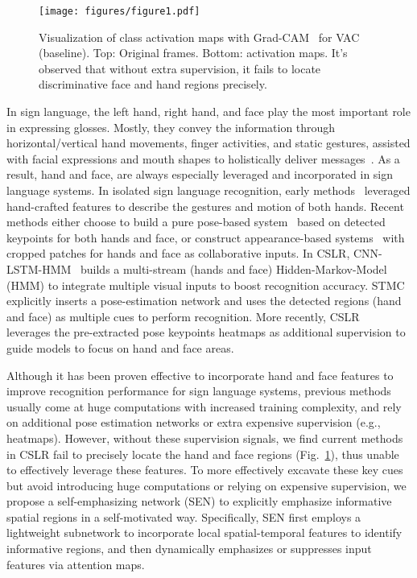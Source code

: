 \documentclass[letterpaper]{article} \usepackage{aaai23}  \usepackage{times}  \usepackage{helvet}  \usepackage{courier}  \usepackage[hyphens]{url}  \usepackage{graphicx} \urlstyle{rm} \def\UrlFont{\rm}  \usepackage{natbib}  \usepackage{caption} \frenchspacing  \setlength{\pdfpagewidth}{8.5in} \setlength{\pdfpageheight}{11in} \usepackage{algorithm}
\begin{document}
\begin{figure}[t]
    \centering
    \texttt{[image: figures/figure1.pdf]}
    \caption{Visualization of class activation maps with Grad-CAM~\cite{selvaraju2017grad} for VAC~\cite{Min_2021_ICCV} (baseline). Top: Original frames. Bottom: activation maps. It's observed that without extra supervision, it fails to locate discriminative face and hand regions precisely. }
    \label{fig1}
  \end{figure}

In sign language, the left hand, right hand, and face play the most important role in expressing glosses. Mostly, they convey the information through horizontal/vertical hand movements, finger activities, and static gestures, assisted with facial expressions and mouth shapes to holistically deliver messages~\cite{dreuw2007speech,ong2005automatic}. As a result, hand and face, are always especially leveraged and incorporated in sign language systems. In isolated sign language recognition, early methods~\cite{freeman1995orientation,sun2013discriminative} leveraged hand-crafted features to describe the gestures and motion of both hands. Recent methods either choose to build a pure pose-based system~\cite{tunga2021pose,hu2021signbert} based on detected keypoints for both hands and face, or construct appearance-based systems~\cite{hu2021hand,boukhayma20193d} with cropped patches for hands and face as collaborative inputs. In CSLR, CNN-LSTM-HMM~\cite{koller2019weakly} builds a multi-stream (hands and face) Hidden-Markov-Model (HMM) to integrate multiple visual inputs to boost recognition accuracy. STMC~\cite{zhou2020spatial} explicitly inserts a pose-estimation network and uses the detected regions (hand and face) as multiple cues to perform recognition. More recently, CSLR~\cite{zuo2022c2slr} leverages the pre-extracted pose keypoints heatmaps as additional supervision to guide models to focus on hand and face areas. 

Although it has been proven effective to incorporate hand and face features to improve recognition performance for sign language systems, previous methods usually come at huge computations with increased training complexity, and rely on additional pose estimation networks or extra expensive supervision (e.g., heatmaps). However, without these supervision signals, we find current methods~\cite{Min_2021_ICCV,hao2021self,cheng2020fully} in CSLR fail to precisely locate the hand and face regions (Fig.~\ref{fig1}), thus unable to effectively leverage these features. To more effectively excavate these key cues but avoid introducing huge computations or relying on expensive supervision, we propose a self-emphasizing network (SEN) to explicitly emphasize informative spatial regions in a self-motivated way. Specifically, SEN first employs a lightweight subnetwork to incorporate local spatial-temporal features to identify informative regions, and then dynamically emphasizes or suppresses input features via attention maps. 
\end{document}
